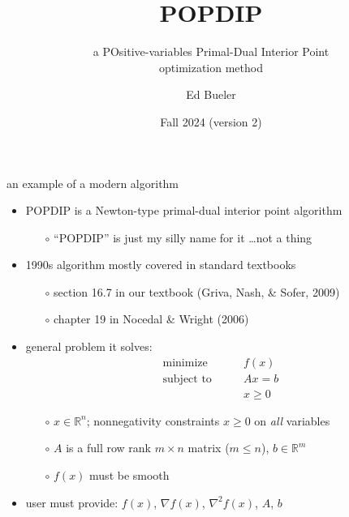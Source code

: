 \documentclass[10pt,hyperref,dvipsnames]{beamer}
\title{POPDIP}
\subtitle{a POsitive-variables Primal-Dual Interior Point \\ optimization method}
\author{Ed Bueler}
\institute[MATH 661]{MATH 661 Optimization}
\date{Fall 2024 (version 2)}
\newcommand{\grad}{\nabla}
\newcommand{\RR}{\mathbb{R}}
\begin{document}
\beamertemplatenavigationsymbolsempty

\begin{frame}
  \maketitle
\end{frame}


\begin{frame}{an example of a modern algorithm}

\begin{itemize}
\item POPDIP is a Newton-type primal-dual interior point algorithm
    \begin{itemize}
    \item[$\circ$] ``POPDIP'' is just my silly name for it \dots not a thing
    \end{itemize}
\item 1990s algorithm mostly covered in standard textbooks
    \begin{itemize}
    \item[$\circ$] section 16.7 in our textbook (Griva, Nash, \& Sofer, 2009)
    \item[$\circ$] chapter 19 in Nocedal \& Wright (2006)
    \end{itemize}

\bigskip
\item general problem it solves:
\begin{equation*}
\begin{matrix}
\text{minimize} \qquad   & f(x) \\
\text{subject to} \qquad & A x = b \\
                         & x \ge 0
\end{matrix}
\end{equation*}

    \begin{itemize}
    \item[$\circ$] $x\in \RR^n$; nonnegativity constraints $x\ge 0$ on \emph{all} variables
    \item[$\circ$] $A$ is a full row rank $m\times n$ matrix ($m\le n$), $b\in\RR^m$
    \item[$\circ$] $f(x)$ must be smooth
    \end{itemize}
\item user must provide: $f(x)$, $\grad f(x)$, $\grad^2 f(x)$, $A$, $b$
\end{itemize}
\end{frame}
\end{document}
